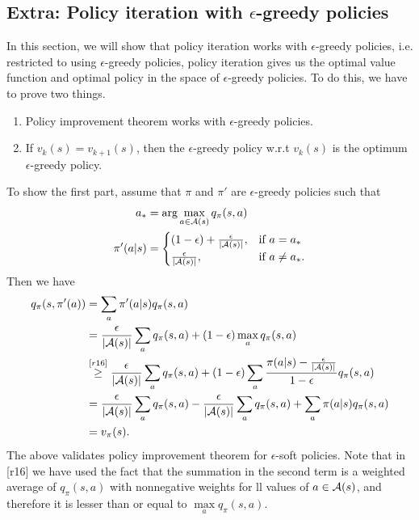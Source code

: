 \documentclass[10pt]{article}
\begin{document}
 	\subsection*{Extra: Policy iteration with $\epsilon$-greedy policies}
 	\label{ex:pi-eps-greedy}
 	In this section, we will show that policy iteration works with $\epsilon$-greedy policies, i.e. restricted to using $\epsilon$-greedy policies, policy iteration gives us the optimal value function and optimal policy in the space of $\epsilon$-greedy policies. To do this, we have to prove two things.
 	\begin{enumerate}
 		\item Policy improvement theorem works with $\epsilon$-greedy policies.
 		\item If $v_k(s) = v_{k+1}(s)$, then the $\epsilon$-greedy policy w.r.t $v_k(s)$ is the optimum $\epsilon$-greedy policy.
 	\end{enumerate}
 	To show the first part, assume that $\pi$ and $\pi'$ are $\epsilon$-greedy policies such that
 	\begin{align*}
 	a_* &= \arg\max_{a\in\mathcal{A}(s)} q_\pi(s,a)\\
 	\pi'(a|s) &= \begin{cases}
 	(1-\epsilon) + \frac{\epsilon}{|\mathcal{A}(s)|},& \text{if } a = a_*\\
 	\frac{\epsilon}{|\mathcal{A}(s)|},& \text{if } a\neq a_*.
 	\end{cases}
 	\end{align*}
 	Then we have
 	\begin{align*}
 	q_\pi(s,\pi'(a)) &= \sum_a \pi'(a|s) q_\pi(s,a)\\
 	&= \frac{\epsilon}{|\mathcal{A}(s)|} \sum_a q_\pi(s,a) + (1-\epsilon) \max\limits_a q_\pi(s,a)\\
 	&\stackrel{[r16]}{\geq} \frac{\epsilon}{|\mathcal{A}(s)|} \sum_a q_\pi(s,a) + (1-\epsilon) \sum_a \frac{ \pi(a|s) - \frac{\epsilon}{|\mathcal{A}(s)|}}{1-\epsilon} q_\pi(s,a)\\
 	&= \frac{\epsilon}{|\mathcal{A}(s)|} \sum_a q_\pi(s,a) - \frac{\epsilon}{|\mathcal{A}(s)|} \sum_a q_\pi(s,a) + \sum_a \pi(a|s)q_\pi(s,a)\\
 	&= v_\pi(s).
 	\end{align*}
 	The above validates policy improvement theorem for $\epsilon$-soft policies. Note that in [r16] we have used the fact that the summation in the second term is a weighted average of $q_\pi(s,a)$ with nonnegative weights for ll values of $a\in\mathcal{A}(s)$, and therefore it is lesser than or equal to $\max\limits_a q_\pi(s,a)$.\par\noindent
\end{document}

